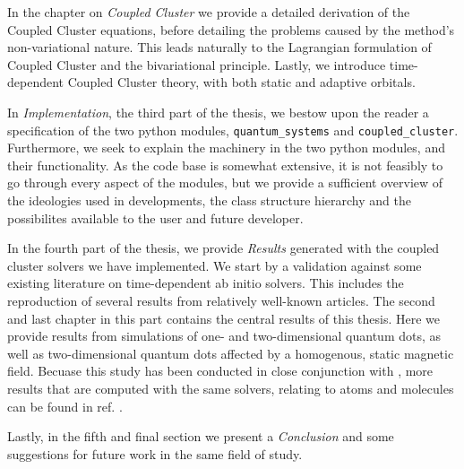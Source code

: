     In the chapter on \emph{Coupled Cluster} we provide a detailed derivation
    of the Coupled Cluster equations, before detailing the problems caused 
    by the method's non-variational nature. This leads naturally to 
    the Lagrangian formulation of Coupled Cluster\cite{helgaker1988analytical}
    and the bivariational principle\cite{arponen1983variational}. Lastly,
    we introduce time-dependent Coupled Cluster theory, with both static and 
    adaptive orbitals\cite{kvaal2012ab}.

    In \emph{Implementation}, the third part of the thesis, we bestow upon the reader 
    a specification of the two python modules, \lstinline{quantum_systems} 
    and \lstinline{coupled_cluster}. Furthermore, we seek to explain the machinery
    in the two python modules, and their functionality. As the code base is somewhat 
    extensive, it is not feasibly to go through every aspect of the modules, but we 
    provide a sufficient overview of the ideologies used in developments, the class
    structure hierarchy and the possibilites available to the user and future developer.

    In the fourth part of the thesis, we provide \emph{Results} generated with the
    coupled cluster solvers we have implemented. We start by a validation against
    some existing literature on time-dependent ab initio solvers. This includes 
    the reproduction of several results from relatively well-known articles. 
    The second and last chapter in this part contains the central results of 
    this thesis. Here we provide results from simulations of one- and two-dimensional 
    quantum dots, as well as two-dimensional quantum 
    dots affected by a homogenous, static magnetic field. Becuase this study 
    has been conducted in close conjunction with
    \citeauthor{islandwind2019}, more results that are computed with the 
    same solvers, relating to atoms and molecules can be found in ref.
    \cite{islandwind2019}.
   
    Lastly, in the fifth and final section we present a \emph{Conclusion} and 
    some suggestions for future work in the same field of study.

